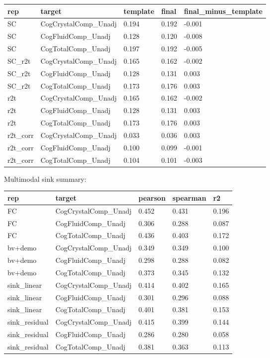 {\def\LTcaptype{none} %
\begin{longtable}[]{@{}lllll@{}}
\toprule\noalign{}
rep & target & template & final & final\_minus\_template \\
\midrule\noalign{}
\endhead
\bottomrule\noalign{}
\endlastfoot
SC & CogCrystalComp\_Unadj & 0.194 & 0.192 & -0.001 \\
SC & CogFluidComp\_Unadj & 0.128 & 0.120 & -0.008 \\
SC & CogTotalComp\_Unadj & 0.197 & 0.192 & -0.005 \\
SC\_r2t & CogCrystalComp\_Unadj & 0.165 & 0.162 & -0.002 \\
SC\_r2t & CogFluidComp\_Unadj & 0.128 & 0.131 & 0.003 \\
SC\_r2t & CogTotalComp\_Unadj & 0.173 & 0.176 & 0.003 \\
r2t & CogCrystalComp\_Unadj & 0.165 & 0.162 & -0.002 \\
r2t & CogFluidComp\_Unadj & 0.128 & 0.131 & 0.003 \\
r2t & CogTotalComp\_Unadj & 0.173 & 0.176 & 0.003 \\
r2t\_corr & CogCrystalComp\_Unadj & 0.033 & 0.036 & 0.003 \\
r2t\_corr & CogFluidComp\_Unadj & 0.100 & 0.099 & -0.001 \\
r2t\_corr & CogTotalComp\_Unadj & 0.104 & 0.101 & -0.003 \\
\end{longtable}
}

Multimodal sink summary:

{\def\LTcaptype{none} %
\begin{longtable}[]{@{}lllll@{}}
\toprule\noalign{}
rep & target & pearson & spearman & r2 \\
\midrule\noalign{}
\endhead
\bottomrule\noalign{}
\endlastfoot
FC & CogCrystalComp\_Unadj & 0.452 & 0.431 & 0.196 \\
FC & CogFluidComp\_Unadj & 0.306 & 0.288 & 0.087 \\
FC & CogTotalComp\_Unadj & 0.436 & 0.403 & 0.172 \\
bv+demo & CogCrystalComp\_Unadj & 0.349 & 0.349 & 0.100 \\
bv+demo & CogFluidComp\_Unadj & 0.298 & 0.288 & 0.082 \\
bv+demo & CogTotalComp\_Unadj & 0.373 & 0.345 & 0.132 \\
sink\_linear & CogCrystalComp\_Unadj & 0.414 & 0.402 & 0.165 \\
sink\_linear & CogFluidComp\_Unadj & 0.301 & 0.296 & 0.088 \\
sink\_linear & CogTotalComp\_Unadj & 0.401 & 0.381 & 0.153 \\
sink\_residual & CogCrystalComp\_Unadj & 0.415 & 0.399 & 0.144 \\
sink\_residual & CogFluidComp\_Unadj & 0.286 & 0.280 & 0.058 \\
sink\_residual & CogTotalComp\_Unadj & 0.381 & 0.363 & 0.113 \\
\end{longtable}
}

